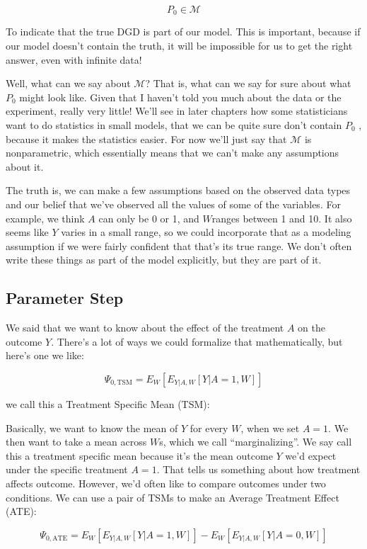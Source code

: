 \documentclass[
  12pt, krantz2,
]{krantz}
\theoremstyle{definition}
\theoremstyle{definition}
\theoremstyle{definition}
\newcommand{\1}{\mathbbm{1}}
\begin{document}
\[P_0 \in \mathcal{M}\]

To indicate that the true DGD is part of our model. This is important, because if our model doesn't contain the truth, it will be impossible for us to get the right answer, even with infinite data!

Well, what can we say about \(\mathcal{M}\)? That is, what can we say for sure about what \(P_0\) might look like. Given that I haven't told you much about the data or the experiment, really very little! We'll see in later chapters how some statisticians want to do statistics in small models, that we can be quite sure don't contain \(P_0\) , because it makes the statistics easier. For now we'll just say that \(\mathcal{M}\) is nonparametric, which essentially means that we can't make any assumptions about it.

The truth is, we can make a few assumptions based on the observed data types and our belief that we've observed all the values of some of the variables. For example, we think \(A\) can only be 0 or 1, and \(W\)ranges between 1 and 10. It also seems like \(Y\) varies in a small range, so we could incorporate that as a modeling assumption if we were fairly confident that that's its true range. We don't often write these things as part of the model explicitly, but they are part of it.

\hypertarget{parameter-step}{%
\subsection{Parameter Step}\label{parameter-step}}

We said that we want to know about the effect of the treatment \(A\) on the outcome \(Y\). There's a lot of ways we could formalize that mathematically, but here's one we like:

\[\Psi_{0,\text{TSM}}=E_W[E_{Y|A,W}[Y|A=1,W]]\]

we call this a Treatment Specific Mean (TSM):

Basically, we want to know the mean of \(Y\) for every \(W\), when we set \(A=1\). We then want to take a mean across \(W\)s, which we call ``marginalizing''. We say call this a treatment specific mean because it's the mean outcome \(Y\) we'd expect under the specific treatment \(A=1\). That tells us something about how treatment affects outcome. However, we'd often like to compare outcomes under two conditions. We can use a pair of TSMs to make an Average Treatment Effect (ATE):

\[\Psi_{0,\text{ATE}}=E_W[E_{Y|A,W}[Y|A=1,W]]- E_W[E_{Y|A,W}[Y|A=0,W]]\]
\end{document}
